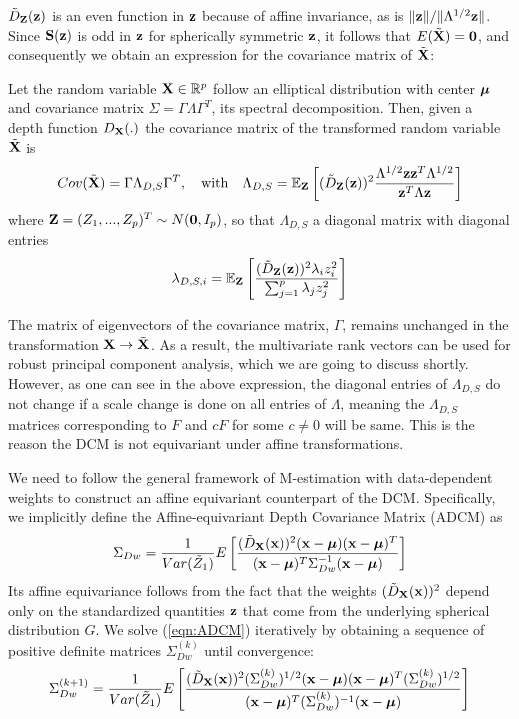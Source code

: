 \documentclass[fleqn,11pt]{article}
\begin{document}
$\tilde D_{\mathbf{Z}}({\bf{z}})$ is an even function in ${\bf{z}}$ because of affine invariance, as is $\| {\bf{z}} \| / \|\Lambda^{1/2} {\bf{z}} \|$. Since ${\mathbf{S}}({\bf{z}})$ is odd in ${\bf{z}}$ for spherically symmetric ${\bf{z}}$, it follows that $E(\tilde {{\mathbf{X}}}) = \bf0$, and consequently we obtain an expression for the covariance matrix of $\tilde {{\mathbf{X}}}$:

\begin{Theorem} \label{Theorem:covform}
Let the random variable ${\mathbf{X}} \in \mathbb{R}^p$ follow an elliptical distribution with center ${\boldsymbol{\mu}}$ and covariance matrix $\Sigma = \Gamma\Lambda\Gamma^T$, its spectral decomposition. Then, given a depth function $D_{\mathbf{X}}(.)$ the covariance matrix of the transformed random variable $\tilde{{\mathbf{X}}}$ is
\begin{equation} \label{equation:covformEq1}
Cov(\tilde {{\mathbf{X}}}) = \Gamma \Lambda_{D,S} \Gamma^T,\quad\mbox{with}\quad \Lambda_{D,S} = \mathbb E_{\mathbf{Z}} \left[ (\tilde D_{\mathbf{Z}}({\bf{z}}))^2 \frac{\Lambda^{1/2} {\bf{z}} {\bf{z}}^T \Lambda^{1/2}}{{\bf{z}}^T \Lambda {\bf{z}}} \right]
\end{equation}
where ${\mathbf{Z}} = (Z_1,...,Z_p)^T \sim N({\bf 0}, I_p)$, so that $\Lambda_{D,S}$ a diagonal matrix with diagonal entries
%
$$ \lambda_{D,S,i} = \mathbb E_{\mathbf{Z}} \left[ \frac{(\tilde D_{\mathbf{Z}}({\bf{z}}))^2 \lambda_i z_i^2}{\sum_{j=1}^p \lambda_j z_j^2} \right] $$
\end{Theorem}

The matrix of eigenvectors of the covariance matrix, $\Gamma$, remains unchanged in the transformation ${\mathbf{X}} \rightarrow \tilde {{\mathbf{X}}}$. As a result, the multivariate rank vectors can be used for robust principal component analysis, which we are going to discuss shortly. However, as one can see in the above expression, the diagonal entries of $\Lambda_{D,S}$ do not change if a scale change is done on all entries of $\Lambda$, meaning the $\Lambda_{D,S}$ matrices corresponding to $F$ and $cF$ for some $c \neq 0$ will be same. This is the reason the DCM is not equivariant under affine transformations.

We need to follow the general framework of M-estimation with data-dependent weights \cite{HuberBook81} to construct an affine equivariant counterpart of the DCM. Specifically, we implicitly define the Affine-equivariant Depth Covariance Matrix (ADCM) as
%
\begin{equation} \label{eqn:ADCM}
\Sigma_{Dw} = \frac{1}{Var (\tilde Z_1) } E \left[ \frac{(\tilde D_{\mathbf{X}}({\bf{x}}))^2 ({\bf{x}} - {\boldsymbol{\mu}}) ({\bf{x}} - {\boldsymbol{\mu}})^T}{({\bf{x}} - {\boldsymbol{\mu}})^T \Sigma_{Dw}^{-1} ({\bf{x}} - {\boldsymbol{\mu}})} \right]
\end{equation}
%
Its affine equivariance follows from the fact that the weights $(\tilde D_{\mathbf{X}} ({\bf{x}}))^2$ depend only on the standardized quantities ${\bf{z}}$ that come from the underlying spherical distribution $G$. We solve (\ref{eqn:ADCM}) iteratively by obtaining a sequence of positive definite matrices $\Sigma^{(k)}_{Dw}$ until convergence:
%
$$ \Sigma^{(k+1)}_{Dw} = \frac{1}{Var (\tilde Z_1) } E \left[ \frac{(\tilde D_{\mathbf{X}}({\bf{x}}))^2 (\Sigma^{(k)}_{Dw})^{1/2} ({\bf{x}} - {\boldsymbol{\mu}}) ({\bf{x}} - {\boldsymbol{\mu}})^T (\Sigma^{(k)}_{Dw})^{1/2}}{({\bf{x}} - {\boldsymbol{\mu}})^T (\Sigma^{(k)}_{Dw})^{-1} ({\bf{x}} - {\boldsymbol{\mu}})} \right] $$
%
\end{document}

